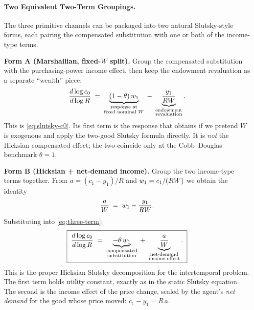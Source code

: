 \paragraph{Two Equivalent Two-Term Groupings.}
The three primitive channels can be packaged into two natural Slutsky-style forms, each pairing the compensated substitution with one or both of the income-type terms.

\medskip
\noindent
\textbf{Form A (Marshallian, fixed-$W$ split).} Group the compensated substitution with the purchasing-power income effect, then keep the endowment revaluation as a separate ``wealth'' piece:
\begin{equation}
\frac{d\log c_0}{d\log R} \;=\; \underbrace{(1-\theta)\,w_1}_{\substack{\text{response at}\\\text{fixed nominal }W}} \;-\; \underbrace{\frac{y_1}{RW}}_{\substack{\text{endowment}\\\text{revaluation}}}.
\label{eq:slutsky-fixedW}
\end{equation}
This is \cref{eq:slutsky-c0}. Its first term is the response that obtains if we pretend $W$ is exogenous and apply the two-good Slutsky formula directly. It is \emph{not} the Hicksian compensated effect; the two coincide only at the Cobb--Douglas benchmark $\theta = 1$.

\medskip
\noindent
\textbf{Form B (Hicksian + net-demand income).} Group the two income-type terms together. From $a = (c_1 - y_1)/R$ and $w_1 = c_1/(RW)$ we obtain the identity
\begin{equation}
\frac{a}{W} \;=\; w_1 - \frac{y_1}{RW}.
\label{eq:saving-identity}
\end{equation}
Substituting into \cref{eq:three-term}:
\begin{equation}
\boxed{\;\frac{d\log c_0}{d\log R} \;=\; \underbrace{-\theta\,w_1}_{\substack{\text{compensated}\\\text{substitution}}} \;+\; \underbrace{\frac{a}{W}}_{\substack{\text{net-demand}\\\text{income effect}}}.\;}
\label{eq:slutsky-hicksian}
\end{equation}
This is the proper Hicksian Slutsky decomposition for the intertemporal problem. The first term holds utility constant, exactly as in the static Slutsky equation. The second is the income effect of the price change, scaled by the agent's \emph{net demand} for the good whose price moved: $c_1 - y_1 = R\,a$.

